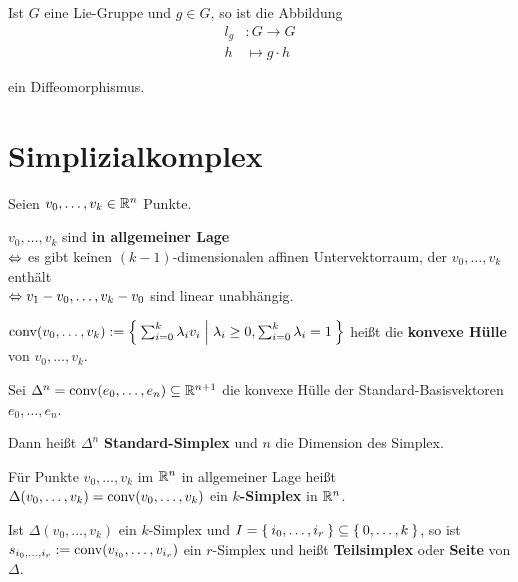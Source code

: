 \begin{bemerkung}
    Ist $G$ eine Lie-Gruppe und $g \in G$, so ist die Abbildung
    \begin{align*}
        l_g &: G \rightarrow G\\
        h  &\mapsto g \cdot h
    \end{align*}

    ein Diffeomorphismus.
\end{bemerkung}

\section{Simplizialkomplex}
\begin{definition}%
    Seien $v_0, \dots, v_k \in \mathbb{R}^n$ Punkte.
    \begin{defenum}
        \item $v_0, \dots, v_k$ sind \textbf{in allgemeiner Lage}\\
        \hspace{\labelwidth}\phantom{--}$\Leftrightarrow$ es gibt keinen $(k-1)$-dimensionalen
              affinen Untervektorraum, der $v_0, \dots, v_k$ enthält\\
        \hspace{\labelwidth}\phantom{--}$\Leftrightarrow v_1 - v_0, \dots, v_k - v_0$ sind linear unabhängig.
        \item $\operatorname{conv}(v_0, \dots, v_k) := \Set{\sum_{i=0}^k \lambda_i v_i | \lambda_i \geq 0, \sum_{i=0}^k \lambda_i = 1} $ heißt die \textbf{konvexe Hülle} von $v_0, \dots, v_k$.
    \end{defenum}
\end{definition}

\begin{definition}
    \begin{defenum}
        \item Sei $\Delta^n = \operatorname{conv}(e_0, \dots, e_n) \subseteq \mathbb{R}^{n+1}$
              die konvexe Hülle der Standard-Basisvektoren $e_0, \dots, e_n$.

              Dann heißt $\Delta^n$ \textbf{Standard-Simplex}
              und $n$ die Dimension des Simplex.
        \item Für Punkte $v_0, \dots, v_k$ im $\mathbb{R}^n$ in allgemeiner
              Lage heißt $\Delta (v_0, \dots, v_k) = \operatorname{conv}(v_0, \dots, v_k)$
              ein \textbf{$k$-Simplex} in $\mathbb{R}^n$.
        \item Ist $\Delta (v_0, \dots, v_k)$ ein $k$-Simplex und
              $I = \Set{i_0, \dots, i_r} \subseteq \Set{0, \dots, k}$,
              so ist $s_{i_0, \dots, i_r} := \operatorname{conv}(v_{i_0}, \dots, v_{i_r})$
              ein $r$-Simplex und heißt
              \textbf{Teilsimplex} oder \textbf{Seite}
              von $\Delta$.
    \end{defenum}
\end{definition}

